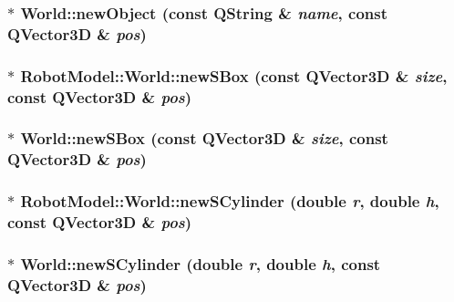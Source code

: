 \label{class_robot_model_1_1_world_ab806377e96318c2e3e24a273ffc99cb2}
\hypertarget{class_robot_model_1_1_world_a82289c85d931bffc967a90a12e04477a}{
\subsubsection[{newObject}]{ $\ast$ World::newObject (const QString \& {\em name}, \/  const QVector3D \& {\em pos})}}
\label{class_robot_model_1_1_world_a82289c85d931bffc967a90a12e04477a}
\hypertarget{class_robot_model_1_1_world_afc5192e95d3dfe41cef8a8122cfb0b1d}{
\subsubsection[{newSBox}]{$\ast$ RobotModel::World::newSBox (const QVector3D \& {\em size}, \/  const QVector3D \& {\em pos})}}
\label{class_robot_model_1_1_world_afc5192e95d3dfe41cef8a8122cfb0b1d}
\hypertarget{class_robot_model_1_1_world_adf2304f9f78471e03d2962b326fe4ce9}{
\subsubsection[{newSBox}]{ $\ast$ World::newSBox (const QVector3D \& {\em size}, \/  const QVector3D \& {\em pos})}}
\label{class_robot_model_1_1_world_adf2304f9f78471e03d2962b326fe4ce9}
\hypertarget{class_robot_model_1_1_world_a79ae7f54ffaaff409cc84352fabe71f5}{
\subsubsection[{newSCylinder}]{$\ast$ RobotModel::World::newSCylinder (double {\em r}, \/  double {\em h}, \/  const QVector3D \& {\em pos})}}
\label{class_robot_model_1_1_world_a79ae7f54ffaaff409cc84352fabe71f5}
\hypertarget{class_robot_model_1_1_world_a36ee6c4337fbe9097f2bc30a1843cdb5}{
\subsubsection[{newSCylinder}]{ $\ast$ World::newSCylinder (double {\em r}, \/  double {\em h}, \/  const QVector3D \& {\em pos})}}
